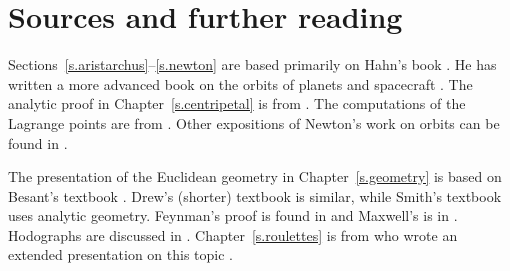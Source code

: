 
\chapter*{Sources and further reading}


Sections~\ref{s.aristarchus}--\ref{s.newton} are based primarily on Hahn's book \cite{hahn-cic}. He has written a more advanced book on the orbits of planets and spacecraft \cite{hahn-orbits}. The analytic proof in Chapter~\ref{s.centripetal} is from \cite{griffiths}. The computations of the Lagrange points are from \cite{stern}. Other expositions of Newton's work on orbits can be found in \cite{hauser-lang,stein}. 

The presentation of the Euclidean geometry in Chapter~\ref{s.geometry} is based on Besant's textbook \cite{besant}. Drew's (shorter) textbook \cite{drew} is similar, while Smith's textbook \cite{smith} uses analytic geometry. Feynman's proof is found in \cite{lost} and Maxwell's is in \cite[Article CXXXIII]{maxwell}. Hodographs are discussed in \cite{hodograph}. Chapter~\ref{s.roulettes} is from \cite[Chapter~X]{besant} who wrote an extended presentation on this topic \cite{besant-r-g}.

\begin{small}


\end{small}
